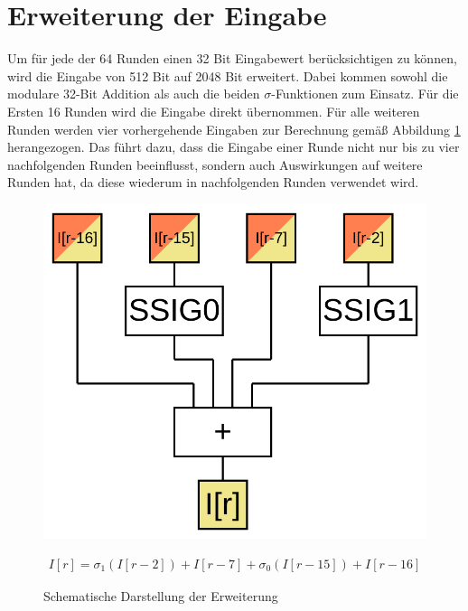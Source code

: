 \section{Erweiterung der Eingabe}
\label{sec:sha256:erweiterung}

Um für jede der 64 Runden einen 32 Bit Eingabewert berücksichtigen zu können, wird die Eingabe von 512 Bit auf 2048 Bit erweitert.
Dabei kommen sowohl die modulare 32-Bit Addition als auch die beiden $\sigma$-Funktionen zum Einsatz.
Für die Ersten 16 Runden wird die Eingabe direkt übernommen. Für alle weiteren Runden werden vier vorhergehende Eingaben zur Berechnung
gemäß Abbildung \ref{fig:sha256prep} herangezogen. Das führt dazu, dass die Eingabe einer Runde nicht nur bis zu vier nachfolgenden
Runden beeinflusst, sondern auch Auswirkungen auf weitere Runden hat, da diese wiederum in nachfolgenden Runden verwendet wird.

\begin{figure}[!h]
  \centering
  \begin{minipage}[c]{5cm}
    \includegraphics[scale=0.4]{images/sha256prepS}
  \end{minipage}
  \begin{minipage}[c]{6cm}
    \begin{align}
      I[r] = \sigma_1(I[r-2]) + I[r-7] + \sigma_0(I[r-15]) + I[r-16] \nonumber
    \end{align}
  \end{minipage}
  \caption{Schematische Darstellung der Erweiterung}
  \label{fig:sha256prep}
\end{figure}